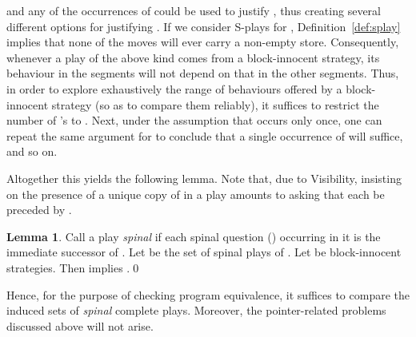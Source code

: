 \documentclass{CSML}
\theoremstyle{definition}\newtheorem{definition}[thm]{Definition}
\theoremstyle{definition}\newtheorem{example}[thm]{Example}
\theoremstyle{definition}\newtheorem{proposition}[thm]{Proposition}
\theoremstyle{definition}\newtheorem{lemma}[thm]{Lemma}
\theoremstyle{definition}\newtheorem{theorem}[thm]{Theorem}
\theoremstyle{definition}\newtheorem{corollary}[thm]{Corollary}
\theoremstyle{definition}\newtheorem{remark}[thm]{Remark}
\newcommand\cutout[1]{}
\begin{document}
and any of the occurrences of  could be used to justify , thus creating several different options for justifying .
If we consider S-plays for , Definition~\ref{def:splay} implies that none of the moves  will ever carry a non-empty store.
Consequently, whenever a play of the above kind comes from a block-innocent strategy, its behaviour in  the  segments
will not depend on that in the other  segments. Thus, in order to explore exhaustively the range of behaviours offered by a block-innocent strategy
(so as to compare them reliably), it suffices to restrict the number of 's  to .
Next, under the assumption that  occurs only once, one can repeat the same argument for  to conclude
that a single occurrence of  will suffice, and so on.
\cutout{
Consider  (i.e. ),
which contains plays of the form  for any . Pointers are still uniquely
determined in these plays, but everything changes once O plays  next.
Then the target might be any of the  occurrences of . The strategy in question actually 
offers responses in all such cases, so it would seem that all of these plays need to be represented
(thus necessitating the use of an infinite alphabet). Fortunately, thanks to block-innocence, we
can restrict ourselves to the case  and make the problem disappear. To see why, 
observe that none of the moves  will ever carry a non-empty store in an S-play,
by Definition~\ref{def:splay}. Thus, because the strategy is block-innocent, its behaviour is already represented faithfully
by the single play . In fact, this is one of the cases when block-innocence implies innocence,
but in general this will not be true for denotations  of -terms.

Hence, we generalize the observation as follows. Since the move  never carries a non-trivial store, it follows that no 
additional information about the strategy is hidden in plays containing two occurrences of . This is because
a block-innocent strategy has to behave uniformly after each  and in general will depend only
on what happened between  and , and not on what happened after a previous copy of 
was played (there can be no communication between the ``threads" started with  because  cannot carry 
a non-trivial store).
Now that it is known that O need only play one occurrence of , we can apply 
a similar reasoning to , and so on. 
}
Altogether this yields the following lemma. Note that, due to Visibility,  
insisting on the presence of a unique copy of  in a play amounts to 
asking that each  be preceded by .
\begin{lemma}
Call a play \emph{spinal} if each spinal question  () occurring in it 
is the immediate successor of .
Let  be the set of spinal plays of .
Let  be block-innocent strategies.
Then  implies .\qed
\end{lemma}
Hence, for the purpose of checking program equivalence, it suffices to compare
the induced sets of \emph{spinal} complete plays. Moreover, the pointer-related problems discussed above will not arise.
\end{document}
